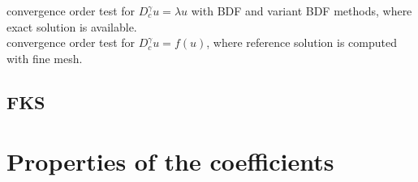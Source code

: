 \documentclass[11pt]{article} %
\begin{document}
convergence order test for $D^\gamma_c u = \lambda u$ with BDF and variant BDF methods, where exact solution is available. \\


convergence order test for $D^\gamma_c u = f( u)$, where reference solution is computed with fine mesh.

\subsection{FKS}



\appendix

\section{Properties of the coefficients}
\end{document}
